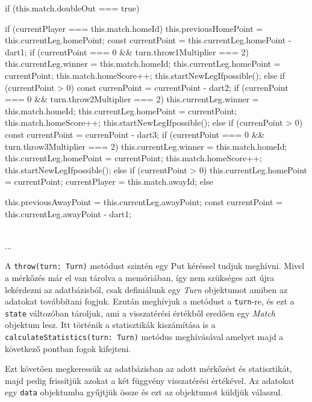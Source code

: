 \begin{cpp}
if (this.match.doubleOut === true) {
  if (currentPlayer === this.match.homeId) {
    this.previousHomePoint = this.currentLeg.homePoint;
    const currentPoint = this.currentLeg.homePoint - dart1;
    if (currentPoint === 0 && turn.throw1Multiplier === 2) {
      this.currentLeg.winner = this.match.homeId;
      this.currentLeg.homePoint = currentPoint;
      this.match.homeScore++;
      this.startNewLegIfpossible();
    } else if (currentPoint > 0) {
      const currenPoint = currentPoint - dart2;
      if (currenPoint === 0 && turn.throw2Multiplier === 2){
       this.currentLeg.winner = this.match.homeId;
       this.currentLeg.homePoint = currentPoint;
       this.match.homeScore++;
       this.startNewLegIfpossible();
      } else if (currenPoint > 0) {
        const currentPoint = currenPoint - dart3;
        if (currentPoint === 0 && turn.throw3Multiplier === 2) {
          this.currentLeg.winner = this.match.homeId;
          this.currentLeg.homePoint = currentPoint;
          this.match.homeScore++;
          this.startNewLegIfpossible();
        } else if (currentPoint > 0) {
          this.currentLeg.homePoint = currentPoint;
        }
      }
    }
    currentPlayer = this.match.awayId;
  } else {
    this.previousAwayPoint = this.currentLeg.awayPoint;
    const currentPoint = this.currentLeg.awayPoint - dart1;
    
    \\...
    
    }
}
\end{cpp}

A \texttt{throw(turn: Turn)} metódust szintén egy Put kéréssel tudjuk meghívni. Mivel a mérkőzés már el van tárolva a memóriában, így nem szükséges azt újra lekérdezni az adatbázisból, csak definiálunk egy \textit{Turn} objektumot amiben az adatokat továbbítani fogjuk. Ezután meghívjuk a metódust a \texttt{turn}-re, és ezt a \texttt{state} változóban tároljuk, ami a visszatérési értékből eredően egy \textit{Match} objektum lesz. Itt történik a statisztikák kiszámítása is a \texttt{calculateStatistics(turn: Turn)} metódus meghívásával amelyet majd a következő pontban fogok kifejteni.

Ezt követően megkeressük az adatbázisban az adott mérkőzést és statisztikát, majd pedig frissítjük azokat a két függvény visszatérési értékével. Az adatokat egy \texttt{data} objektumba gyűjtjük össze és ezt az objektumot küldjük válaszul.

